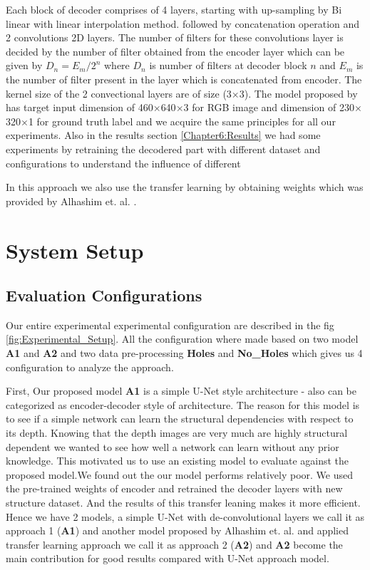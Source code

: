 Each block of decoder comprises of 4 layers, starting with up-sampling by Bi linear with linear interpolation method. followed by concatenation operation and 2 convolutions 2D layers. The number of filters for these convolutions layer is decided by the number of filter obtained from the encoder layer which can be given by \(D_n =  {E_m} / {2^n}\) where \(D_n\) is number of filters at decoder block \(n\) and \(E_m\) is the number of filter present in the layer which is concatenated from encoder. The kernel size of the 2 convectional layers are of size (3$\times$3). The model proposed by  \cite{Alhashim2018} has target input dimension of 460$\times$640$\times$3 for RGB image and  dimension of 230$\times$320$\times$1 for ground truth label and we acquire the same principles for all our experiments. Also in the results section \ref{Chapter6:Results} we had some experiments by retraining the decodered part with different dataset and configurations to understand the influence of different 

In this approach we also use the transfer learning by obtaining weights which was provided by Alhashim et. al. \cite{Alhashim2018}. 


\section{System Setup}
\label{Chapter5:Experimental_Setup}
\subsection{Evaluation Configurations}

Our entire experimental experimental configuration are described in the fig \ref{fig:Experimental_Setup}. All the configuration where made based on two model \textbf{A1} and \textbf{A2} and two data pre-processing \textbf{Holes} and \textbf{No\_Holes} which gives us 4 configuration to analyze the approach. 


First, Our proposed model \textbf{A1} is a simple U-Net style architecture - also can be categorized as encoder-decoder style of architecture. The reason for this model is to see if a simple network can learn the structural dependencies with respect to its depth. Knowing that the depth images are very much are highly structural dependent we wanted to see how well a network can learn without any prior knowledge. This motivated us to use an existing model to evaluate against the proposed model.We found out the our model performs relatively poor. We used the pre-trained weights of encoder and retrained the decoder layers with new structure dataset. And the results of this transfer leaning makes it more efficient. Hence we have 2 models, a simple U-Net with de-convolutional layers we call it as approach 1  (\textbf{A1}) and another model proposed by Alhashim et. al. \cite{Alhashim2018} and applied transfer learning approach we call it as approach 2 (\textbf{A2}) and \textbf{A2} become the main contribution for good results compared with U-Net approach model. 

